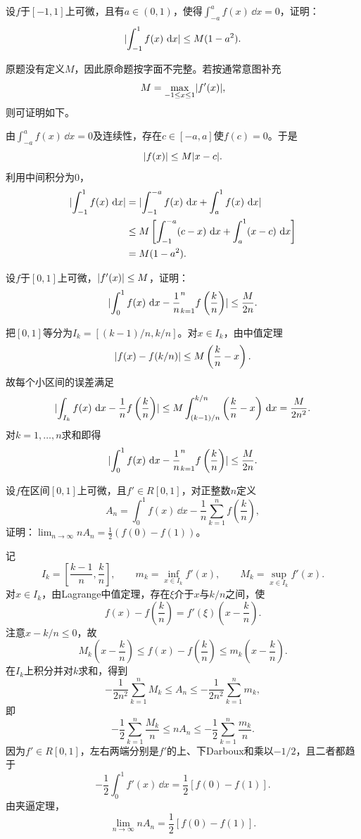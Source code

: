 \begin{xexercise}[9]
设$f$于$[-1,1]$上可微，且有$a\in(0,1)$，使得$\int_{-a}^af(x)\,\dd x=0$，证明：
  \[
    \lvert\int_{-1}^1f(x)\,\mathop{}\!\mathrm{d} x\rvert\le M(1-a^2).
  \]
\end{xexercise}
\begin{xsolution}
原题没有定义$M$，因此原命题按字面不完整。若按通常意图补充
\[
 M=\max_{-1\le x\le1}\lvert f'(x)\rvert,
\]
则可证明如下。

由$\int_{-a}^af(x)\,\dd x=0$及连续性，存在$c\in[-a,a]$使$f(c)=0$。于是
\[
 \lvert f(x)\rvert\le M\lvert x-c\rvert.
\]
利用中间积分为0，
\begin{align*}
\lvert\int_{-1}^1f(x)\,\mathop{}\!\mathrm{d} x\rvert
&=\lvert\int_{-1}^{-a}f(x)\,\mathop{}\!\mathrm{d} x+\int_a^1f(x)\,\mathop{}\!\mathrm{d} x\rvert\\
&\le M\left[
\int_{-1}^{-a}(c-x)\,\mathop{}\!\mathrm{d} x+\int_a^1(x-c)\,\mathop{}\!\mathrm{d} x
\right]\\
&=M(1-a^2).
\end{align*}
\end{xsolution}


\begin{xexercise}[10]
设$f$于$[0,1]$上可微，$\lvert f'(x)\rvert\le M$，证明：
  \[
    \lvert\int_0^1f(x)\,\mathop{}\!\mathrm{d} x-\frac1n\relax_{k=1}^nf\left(\frac kn\right)\rvert\le\frac M{2n}.
  \]
\end{xexercise}
\begin{xsolution}
把$[0,1]$等分为$I_k=[(k-1)/n,k/n]$。对$x\in I_k$，由中值定理
\[
 \lvert f(x)-f(k/n)\rvert\le M\left(\frac kn-x\right).
\]
故每个小区间的误差满足
\[
 \lvert\int_{I_k}f(x)\,\mathop{}\!\mathrm{d} x-\frac1n f\left(\frac kn\right)\rvert
 \le M\int_{(k-1)/n}^{k/n}\left(\frac kn-x\right)\,\mathop{}\!\mathrm{d} x
 =\frac{M}{2n^2}.
\]
对$k=1,\ldots,n$求和即得
\[
 \lvert\int_0^1f(x)\,\mathop{}\!\mathrm{d} x-\frac1n\relax_{k=1}^nf\left(\frac kn\right)\rvert
 \le\frac{M}{2n}.
\]
\end{xsolution}


\begin{xexercise}[11]
设$f$在区间$[0,1]$上可微，且$f'\in R[0,1]$，对正整数$n$定义
  \[
    A_n=\int_0^1f(x)\,\dd x-\frac1n\sum_{k=1}^nf\left(\frac kn\right),
  \]
  证明：$\displaystyle\lim_{n\to\infty}nA_n=\frac12(f(0)-f(1))$。
\end{xexercise}
\begin{xsolution}
记
\[
 I_k=\left[\frac{k-1}{n},\frac kn\right],\qquad
 m_k=\inf_{x\in I_k}f'(x),\qquad
 M_k=\sup_{x\in I_k}f'(x).
\]
对$x\in I_k$，由Lagrange中值定理，存在$\xi$介于$x$与$k/n$之间，使
\[
 f(x)-f\left(\frac kn\right)
 =f'(\xi)\left(x-\frac kn\right).
\]
注意$x-k/n\le0$，故
\[
 M_k\left(x-\frac kn\right)
 \le f(x)-f\left(\frac kn\right)
 \le m_k\left(x-\frac kn\right).
\]
在$I_k$上积分并对$k$求和，得到
\[
 -\frac1{2n^2}\sum_{k=1}^nM_k
 \le A_n
 \le-\frac1{2n^2}\sum_{k=1}^nm_k,
\]
即
\[
 -\frac12\sum_{k=1}^n\frac{M_k}{n}
 \le nA_n
 \le-\frac12\sum_{k=1}^n\frac{m_k}{n}.
\]
因为$f'\in R[0,1]$，左右两端分别是$f'$的上、下Darboux和乘以$-1/2$，且二者都趋于
\[
 -\frac12\int_0^1f'(x)\,\dd x
 =\frac12[f(0)-f(1)].
\]
由夹逼定理，
\[
 \boxed{\lim_{n\to\infty}nA_n=\frac12[f(0)-f(1)]}.
\]
\end{xsolution}



